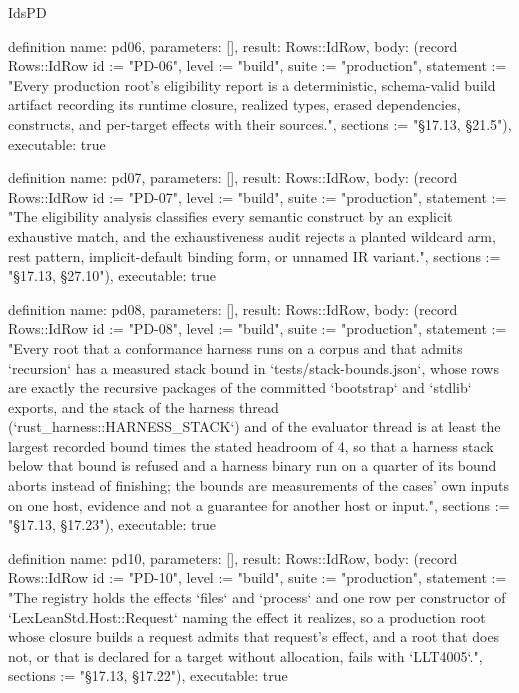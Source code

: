 \begin{lexlean}{IdsPD}
\begin{semanticmodule}
definition{
  name: pd06,
  parameters: [],
  result: Rows::IdRow,
  body: (record Rows::IdRow {id := "PD-06", level := "build", suite := "production", statement := "Every production root's eligibility report is a deterministic, schema-valid build artifact recording its runtime closure, realized types, erased dependencies, constructs, and per-target effects with their sources.", sections := "§17.13, §21.5"}),
  executable: true
}

definition{
  name: pd07,
  parameters: [],
  result: Rows::IdRow,
  body: (record Rows::IdRow {id := "PD-07", level := "build", suite := "production", statement := "The eligibility analysis classifies every semantic construct by an explicit exhaustive match, and the exhaustiveness audit rejects a planted wildcard arm, rest pattern, implicit-default binding form, or unnamed IR variant.", sections := "§17.13, §27.10"}),
  executable: true
}

definition{
  name: pd08,
  parameters: [],
  result: Rows::IdRow,
  body: (record Rows::IdRow {id := "PD-08", level := "build", suite := "production", statement := "Every root that a conformance harness runs on a corpus and that admits `recursion` has a measured stack bound in `tests/stack-bounds.json`, whose rows are exactly the recursive packages of the committed `bootstrap` and `stdlib` exports, and the stack of the harness thread (`rust_harness::HARNESS_STACK`) and of the evaluator thread is at least the largest recorded bound times the stated headroom of 4, so that a harness stack below that bound is refused and a harness binary run on a quarter of its bound aborts instead of finishing; the bounds are measurements of the cases' own inputs on one host, evidence and not a guarantee for another host or input.", sections := "§17.13, §17.23"}),
  executable: true
}

definition{
  name: pd10,
  parameters: [],
  result: Rows::IdRow,
  body: (record Rows::IdRow {id := "PD-10", level := "build", suite := "production", statement := "The registry holds the effects `files` and `process` and one row per constructor of `LexLeanStd.Host::Request` naming the effect it realizes, so a production root whose closure builds a request admits that request's effect, and a root that does not, or that is declared for a target without allocation, fails with `LLT4005`.", sections := "§17.13, §17.22"}),
  executable: true
}
\end{semanticmodule}
\end{lexlean}
